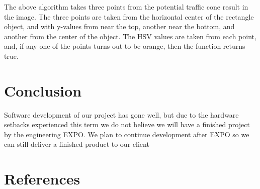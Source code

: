 \documentclass[10pt,letterpaper,onecolumn,draftclsnofoot,journal]{IEEEtran}
\begin{document}
\par
The above algorithm takes three points from the potential traffic cone result in the image. The three points are taken from the horizontal center of the rectangle object, and with y-values from near the top, another near the bottom, and another from the center of the object. The HSV values are taken from each point, and, if any one of the points turns out to be orange, then the function returns true.

\section{Conclusion}
Software development of our project has gone well, but due to the hardware setbacks experienced this term we do not believe we will have a finished project by the engineering EXPO. We plan to continue development after EXPO so we can still deliver a finished product to our client


\section{References}



\end{document}
